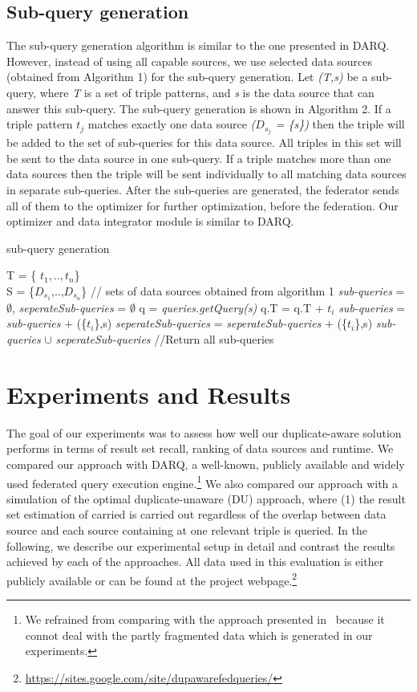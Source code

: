 \documentclass{sig-alternate}  %
\begin{document}
\subsection{Sub-query generation}
 The sub-query generation algorithm is similar to the one presented in DARQ. However, instead of using all capable sources, we use selected data sources (obtained from Algorithm 1) for the sub-query generation. Let \emph{(T,s)} be a sub-query, where \emph{T} is a set of triple patterns, and \emph{s} is the data source that can answer this sub-query. The sub-query generation is shown in Algorithm 2. If a triple pattern \emph{$t_j$} matches exactly one data source \emph{($D_{s_j}$ = \{s\})} then the triple will be added to the set of sub-queries for this data source. All triples in this set will be sent to the data source in one sub-query. If a triple matches more than one data sources then the triple will be sent individually to all matching data sources
in separate sub-queries. After the sub-queries are generated, the federator sends all of them to the optimizer for further optimization, before the federation. Our optimizer and data integrator module is similar to DARQ. 
\begin{algorithm}
\caption{sub-query generation}
\begin{algorithmic} [1]
\REQUIRE T = \{ $t_1,..,t_n$\} \\
 S = \{$D_{s_1}$,..,$D_{s_n}$\} // sets of data sources obtained from algorithm 1  
\STATE \emph{sub-queries} = $\emptyset$, \emph{seperateSub-queries} = $\emptyset$
\STATE q = \emph{queries.getQuery(s)}
\STATE q.T = q.T + $t_i$
\ELSE 
\STATE \emph{sub-queries} = \emph{sub-queries} + (\{$t_i$\},s)
\ENDIF
\ELSE 
{}
\STATE \emph{seperateSub-queries} = \emph{seperateSub-queries} + (\{$t_i$\},s)
\ENDFOR
\ENDIF
\ENDFOR
\RETURN \emph{sub-queries} $\cup$ \emph{seperateSub-queries} //Return all sub-queries
\end{algorithmic}
\end{algorithm}
\section{Experiments and Results}
The goal of our experiments was to assess how well our duplicate-aware solution performs in terms of result set recall, ranking of data sources and runtime.
We compared our approach with DARQ, a well-known, publicly available and widely used federated query execution engine.\footnote{We refrained from comparing with the approach presented in~\cite{key-5} because it connot deal with the partly fragmented data which is generated in our experiments.}
We also compared our approach with a simulation of the optimal duplicate-unaware (DU) approach, where (1) the result set estimation of carried is carried out regardless of the overlap between data source and each source containing at one relevant triple is queried.
In the following, we describe our experimental setup in detail and contrast the results achieved by each of the approaches.
All data used in this evaluation is either publicly available or can be found at the project webpage.\footnote{\url{https://sites.google.com/site/dupawarefedqueries/}}
\end{document}
